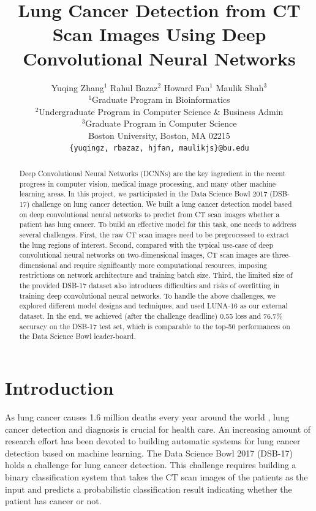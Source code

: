 \documentclass{article}
\title{Lung Cancer Detection from CT Scan Images Using Deep Convolutional Neural Networks}
\author{
  Yuqing Zhang$^1$ \quad Rahul Bazaz$^2$ \quad Howard Fan$^1$ \quad Maulik Shah$^3$ \\
  $^1$Graduate Program in Bioinformatics \\ $^2$Undergraduate Program in Computer Science \& Business Admin \\ $^3$Graduate Program in Computer Science \\
  Boston University, Boston, MA 02215 \\
  \texttt{\{yuqingz, rbazaz, hjfan, maulikjs\}@bu.edu} \\
}
\begin{document}

\maketitle

\begin{abstract}
Deep Convolutional Neural Networks (DCNNs) are the key ingredient in the recent progress in computer vision, medical image processing, and many other machine learning areas. In this project, we participated in the Data Science Bowl 2017 (DSB-17) challenge \cite{dsb17} on lung cancer detection. We built a lung cancer detection model based on deep convolutional neural networks to predict from CT scan images whether a patient has lung cancer. 
To build an effective model for this task, one needs to address several challenges. First, the raw CT scan images need to be preprocessed to extract the lung regions of interest. Second, compared with the typical use-case of deep convolutional neural networks on two-dimensional images, CT scan images are three-dimensional and require significantly more computational resources, imposing restrictions on network architecture and training batch size. Third, the limited size of the provided DSB-17 dataset also introduces difficulties and risks of overfitting in training deep convolutional neural networks.
To handle the above challenges, we explored different model designs and techniques, and used LUNA-16 as our external dataset. 
In the end, we achieved (after the challenge deadline) 0.55 loss and 76.7\% accuracy on the DSB-17 test set, which is comparable to the top-50 performances on the Data Science Bowl leader-board.
\end{abstract}

\section{Introduction}
\label{sec:intro}

As lung cancer causes 1.6 million deaths every year around the world \cite{stewart2014world},  lung cancer detection and diagnosis is crucial for health care. An increasing amount of research effort has been devoted to building automatic systems for lung cancer detection based on machine learning. The Data Science Bowl 2017 (DSB-17) \cite{dsb17} holds a challenge for lung cancer detection. This challenge requires building a binary classification system that takes the CT scan images of the patients as the input and predicts a probabilistic classification result indicating whether the patient has cancer or not.
\end{document}
